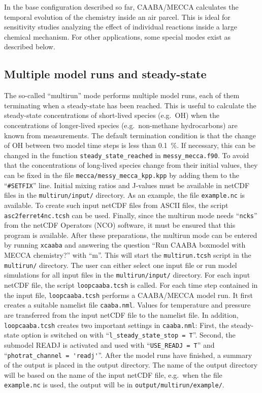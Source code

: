 \documentclass[twoside]{article}
\begin{document}
In the base configuration described so far, CAABA/MECCA calculates the
temporal evolution of the chemistry inside an air parcel. This is ideal
for sensitivity studies analyzing the effect of individual reactions
inside a large chemical mechanism. For other applications, some special
modes exist as described below.

\subsection{Multiple model runs and steady-state}
\label{sec:multirun}

The so-called ``multirun'' mode performs multiple model runs, each of
them terminating when a steady-state has been reached. This is useful to
calculate the steady-state concentrations of short-lived species (e.g.\
OH) when the concentrations of longer-lived species (e.g.\ non-methane
hydrocarbons) are known from measurements. The default termination
condition is that the change of OH between two model time steps is less
than 0.1~\unit{\%}. If necessary, this can be changed in the function
\verb|steady_state_reached| in \verb|messy_mecca.f90|. To avoid that the
concentrations of long-lived species change from their initial values,
they can be fixed in the file \verb|mecca/messy_mecca_kpp.kpp| by adding
them to the ``\verb|#SETFIX|'' line. Initial mixing ratios and J-values
must be available in netCDF files in the \verb|multirun/input/|
directory. As an example, the file \verb|example.nc| is available. To
create such input netCDF files from ASCII files, the script
\verb|asc2ferret4nc.tcsh| can be used. Finally, since the multirun mode
needs ``\verb|ncks|'' from the netCDF Operators (NCO) software, it must
be ensured that this program is available. After these preparations, the
multirun mode can be entered by running \verb|xcaaba| and answering the
question ``Run CAABA boxmodel with MECCA chemistry?'' with ``m''. This
will start the \verb|multirun.tcsh| script in the \verb|multirun/|
directory. The user can either select one input file or run model
simulations for all input files in the \verb|multirun/input/| directory.
For each input netCDF file, the script \verb|loopcaaba.tcsh| is called.
For each time step contained in the input file, \verb|loopcaaba.tcsh|
performs a CAABA/MECCA model run. It first creates a suitable namelist
file \verb|caaba.nml|. Values for temperature and pressure are
transferred from the input netCDF file to the namelist file. In
addition, \verb|loopcaaba.tcsh| creates two important settings in
\verb|caaba.nml|: First, the steady-state option is switched on with
``\verb|l_steady_state_stop = T|''. Second, the submodel READJ is
activated and used with ``\verb|USE_READJ = T|'' and
``\verb|photrat_channel = 'readj'|''. After the model runs have
finished, a summary of the output is placed in the output directory. The
name of the output directory will be based on the name of the input
netCDF file, e.g.\ when the file \verb|example.nc| is used, the output
will be in \verb|output/multirun/example/|.
\end{document}
